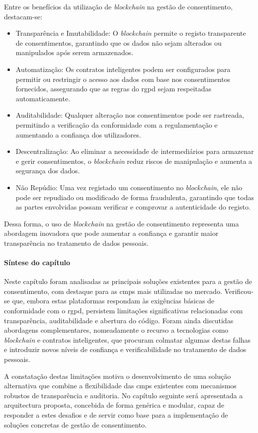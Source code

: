 Entre os benefícios da utilização de \textit{blockchain} na gestão de consentimento, destacam-se:

\begin{itemize}
    \item Transparência e Imutabilidade: O \textit{blockchain} permite o registo transparente de consentimentos, garantindo que os dados não sejam alterados ou manipulados após serem armazenados.
    \item Automatização: Os contratos inteligentes podem ser configurados para permitir ou restringir o acesso aos dados com base nos consentimentos fornecidos, assegurando que as regras do \acrshort{rgpd} sejam respeitadas automaticamente.
    \item Auditabilidade: Qualquer alteração nos consentimentos pode ser rastreada, permitindo a verificação da conformidade com a regulamentação e aumentando a confiança dos utilizadores.
    \item Descentralização: Ao eliminar a necessidade de intermediários para armazenar e gerir consentimentos, o \textit{blockchain} reduz riscos de manipulação e aumenta a segurança dos dados.
    \item Não Repúdio: Uma vez registado um consentimento no \textit{blockchain}, ele não pode ser repudiado ou modificado de forma fraudulenta, garantindo que todas as partes envolvidas possam verificar e comprovar a autenticidade do registo.
\end{itemize}

Dessa forma, o uso de \textit{blockchain} na gestão de consentimento representa uma abordagem inovadora que pode aumentar a confiança e garantir maior transparência no tratamento de dados pessoais.

\paragraph*{Síntese do capítulo} 

Neste capítulo foram analisadas as principais soluções existentes para a gestão de consentimento, com destaque para as \acrshort{cmp}s mais utilizadas no mercado. Verificou-se que, embora estas plataformas respondam às exigências básicas de conformidade com o \acrshort{rgpd}, persistem limitações significativas relacionadas com transparência, auditabilidade e abertura do código. Foram ainda discutidas abordagens complementares, nomeadamente o recurso a tecnologias como \textit{blockchain} e contratos inteligentes, que procuram colmatar algumas destas falhas e introduzir novos níveis de confiança e verificabilidade no tratamento de dados pessoais.

A constatação destas limitações motiva o desenvolvimento de uma solução alternativa que combine a flexibilidade das \acrshort{cmp}s existentes com mecanismos robustos de transparência e auditoria. No capítulo seguinte será apresentada a arquitectura proposta, concebida de forma genérica e modular, capaz de responder a estes desafios e de servir como base para a implementação de soluções concretas de gestão de consentimento.
